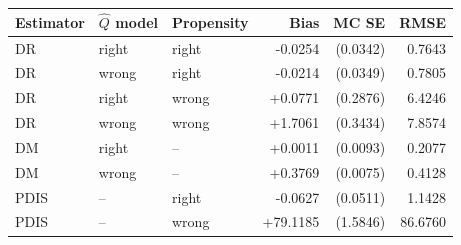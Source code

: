 \begin{tabular}{lllrrr}
\toprule
Estimator & $\hat Q$ model & Propensity & Bias & MC SE & RMSE \\
\midrule
DR & right & right & -0.0254 & (0.0342) & 0.7643 \\
DR & wrong & right & -0.0214 & (0.0349) & 0.7805 \\
DR & right & wrong & +0.0771 & (0.2876) & 6.4246 \\
DR & wrong & wrong & +1.7061 & (0.3434) & 7.8574 \\
DM & right & -- & +0.0011 & (0.0093) & 0.2077 \\
DM & wrong & -- & +0.3769 & (0.0075) & 0.4128 \\
PDIS & -- & right & -0.0627 & (0.0511) & 1.1428 \\
PDIS & -- & wrong & +79.1185 & (1.5846) & 86.6760 \\
\bottomrule
\end{tabular}
